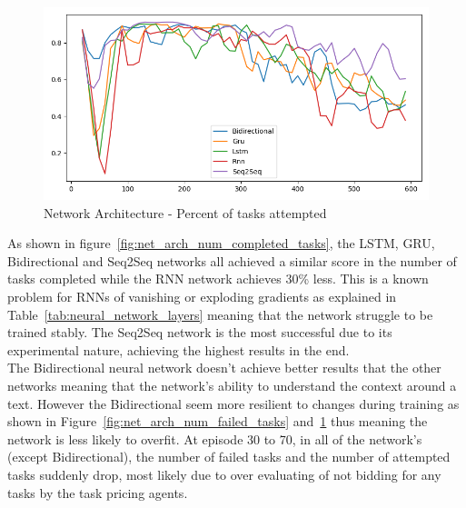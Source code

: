 \begin{figure}[H]
    \centering
    \includegraphics[width=\linewidth]{figures/5_evaluation_figs/net_arch_training_fig/percent_tasks.png}
    \caption{Network Architecture - Percent of tasks attempted}
    \label{fig:net_arch_percent_tasks}
\end{figure}

As shown in figure~\ref{fig:net_arch_num_completed_tasks}, the LSTM, GRU, Bidirectional and Seq2Seq networks all
achieved a similar score in the number of tasks completed while the RNN network achieves 30\% less. This is a known
problem for RNNs of vanishing or exploding gradients as explained in Table~\ref{tab:neural_network_layers} meaning that
the network struggle to be trained stably.
The Seq2Seq network is the most successful due to its experimental nature, achieving the highest results in the end. \\
The Bidirectional neural network doesn't achieve better results that the other networks meaning that the network's
ability to understand the context around a text. However the Bidirectional seem more resilient to changes during
training as shown in Figure~\ref{fig:net_arch_num_failed_tasks} and~\ref{fig:net_arch_percent_tasks} thus meaning the
network is less likely to overfit. At episode 30 to 70, in all of the network's (except Bidirectional), the number of
failed tasks and the number of attempted tasks suddenly drop, most likely due to over evaluating of not bidding for any
tasks by the task pricing agents.
